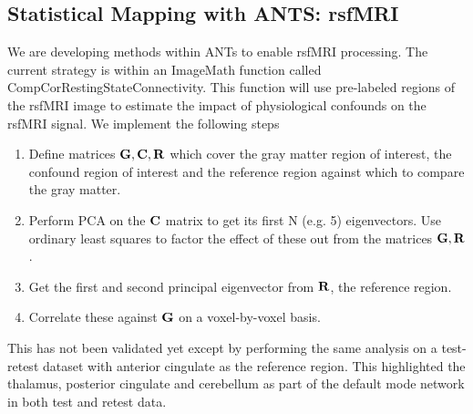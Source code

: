 \documentclass{InsightArticle}
\begin{document}
\subsection{Statistical Mapping with ANTS: rsfMRI}
We are developing methods within ANTs to enable rsfMRI processing.  
The current strategy is within an ImageMath function called
CompCorRestingStateConnectivity.   This function will use pre-labeled
regions of the rsfMRI image to estimate the impact of physiological
confounds on the rsfMRI signal.  We implement the following steps 
\begin{enumerate}
\item Define matrices ${\bf G} , {\bf C},  {\bf R}$ which cover the
  gray matter region of interest, the confound region of interest and
  the reference region against which to compare the gray matter. 
\item Perform PCA on the ${\bf C}$ matrix to get its first N (e.g. 5)
  eigenvectors.  Use ordinary least squares to factor the effect of
  these out from the matrices ${\bf G} ,  {\bf R}$.
\item Get the first and second principal eigenvector from ${\bf R}$,
  the reference region.  
\item Correlate these against ${\bf G}$ on a voxel-by-voxel basis. 
\end{enumerate}
This has not been validated yet except by performing the same analysis
on a test-retest dataset with anterior cingulate as the reference
region.  This highlighted the thalamus, posterior cingulate and
cerebellum as part of the default mode network in both test and retest data.
\end{document}
